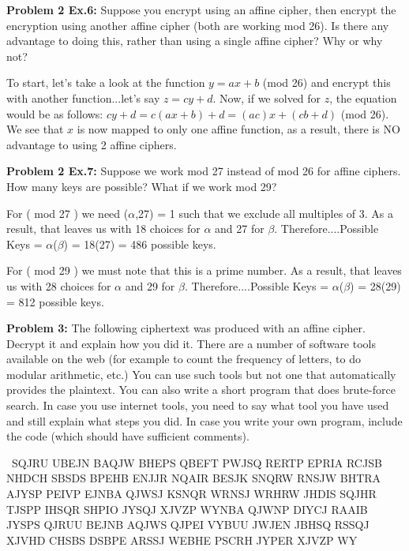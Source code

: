 \documentclass[12pt,letterpaper,final]{report}
\begin{document}
\bigskip
\noindent\textbf{Problem 2 Ex.6:} Suppose you encrypt using an affine cipher, then encrypt the encryption using another affine cipher (both are working mod 26). Is there any advantage to doing this, rather than using a single affine cipher? Why or why not?

\bigskip
\indent\indent To start, let's take a look at the function $y = ax + b$ (mod 26) and encrypt this with another function...let's say $z = cy + d$.  Now, if we solved for $z$, the equation would be as follows: $cy + d = c(ax + b) + d = (ac)x + (cb + d)$ (mod 26). We see that $x$ is now mapped to only one affine function, as a result, there is NO advantage to using 2 affine ciphers. 

\bigskip

\noindent\textbf{Problem 2 Ex.7:} Suppose we work mod 27 instead of mod 26 for affine ciphers. How many keys are possible? What if we work mod 29?

\bigskip\indent\indent For ( mod 27 ) we need ($\alpha$,27) = 1 such that we exclude all multiples of 3. As a result, that leaves us with 18 choices for $\alpha$ and 27 for $\beta$. Therefore....Possible Keys =  $\alpha$($\beta$) = 18(27) = 486 possible keys.

\bigskip\indent\indent For ( mod 29 ) we must note that this is a prime number. As a result, that leaves us with 28 choices for $\alpha$ and 29 for $\beta$. Therefore....Possible Keys =  $\alpha$($\beta$) = 28(29) = 812 possible keys.




\bigskip

\noindent\textbf{Problem 3:} The following ciphertext was produced with an affine cipher. Decrypt it and explain how you did it. There are a number of software tools available on the web (for example to count the frequency of letters, to do modular arithmetic, etc.) You can use such tools but not one that automatically provides the plaintext.  You can also write a short program that does brute-force search. In case you use internet tools, you need to say what tool you have used and still explain what steps you did. In case you write your own program, include the code (which should have sufficient comments).

\bigskip
\indent\ SQJRU UBEJN BAQJW BHEPS QBEFT PWJSQ RERTP EPRIA RCJSB NHDCH SBSDS BPEHB ENJJR NQAIR BESJK SNQRW RNSJW BHTRA AJYSP PEIVP EJNBA QJWSJ KSNQR WRNSJ WRHRW JHDIS SQJHR TJSPP IHSQR SHPIO JYSQJ XJVZP WYNBA QJWNP DIYCJ RAAIB JYSPS QJRUU BEJNB AQJWS QJPEI VYBUU JWJEN JBHSQ RSSQJ XJVHD CHSBS DSBPE ARSSJ WEBHE PSCRH JYPER XJVZP WY
\end{document}
